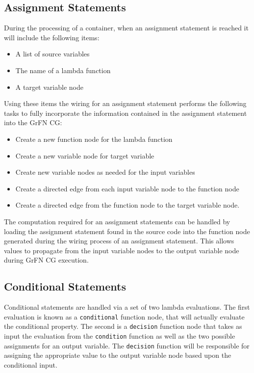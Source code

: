 \subsection{Assignment Statements\label{sec:assg_stmts}}
During the processing of a container, when an assignment statement is reached it will include the following items:
\begin{itemize}
  \item A list of source variables
  \item The name of a lambda function
  \item A target variable node
\end{itemize}
Using these items the wiring for an assignment statement performs the following tasks to fully incorporate the information contained in the assignment statement into the GrFN CG:
\begin{itemize}
  \item Create a new function node for the lambda function
  \item Create a new variable node for target variable
  \item Create new variable nodes as needed for the input variables
  \item Create a directed edge from each input variable node to the function node
  \item Create a directed edge from the function node to the target variable node.
\end{itemize}
The computation required for an assignment statements can be handled by loading the assignment statement found in the source code into the function node generated during the wiring process of an assignment statement.
This allows values to propagate from the input variable nodes to the output variable node during GrFN CG execution.

\subsection{Conditional Statements\label{sec:cond_stmts}}
Conditional statements are handled via a set of two lambda evaluations. The first evaluation is known as a \texttt{conditional} function node, that will actually evaluate the conditional property. The second is a \texttt{decision} function node that takes as input the evaluation from the \texttt{condition} function as well as the two possible assignments for an output variable. The \texttt{decision} function will be responsible for assigning the appropriate value to the output variable node based upon the conditional input.

